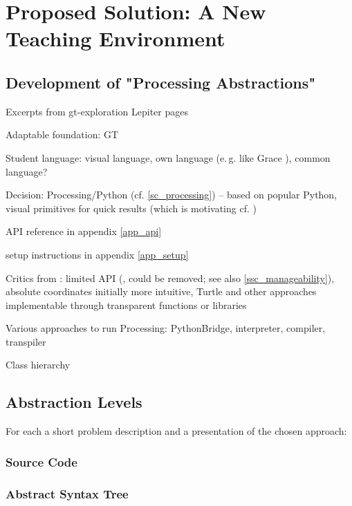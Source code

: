 
\chapter{Proposed Solution: A New Teaching Environment} \label{ch_pa}

\section{Development of "Processing Abstractions"}
Excerpts from gt-exploration Lepiter pages

\begin{todo}
\item Adaptable foundation: GT
\item Student language: visual language, own language (e.\,g. like Grace \cite{Bla18}), common language?
\item Decision: Processing/Python (cf. \ref{sc_processing}) -- based on popular Python, visual primitives for quick results (which is motivating cf. \cite{Chi23})
\item API reference in appendix \ref{app_api}
\item setup instructions in appendix \ref{app_setup}
\item Critics from \cite{Chi23}: limited API (,  could be removed; see also \ref{ssc_manageability}), absolute coordinates initially more intuitive, Turtle and other approaches implementable through transparent functions or libraries
\item Various approaches to run Processing: PythonBridge, interpreter, compiler, transpiler
\item Class hierarchy
\end{todo}


\section{Abstraction Levels}
For each a short problem description and a presentation of the chosen approach:

\subsection{Source Code}
\subsection{Abstract Syntax Tree}
